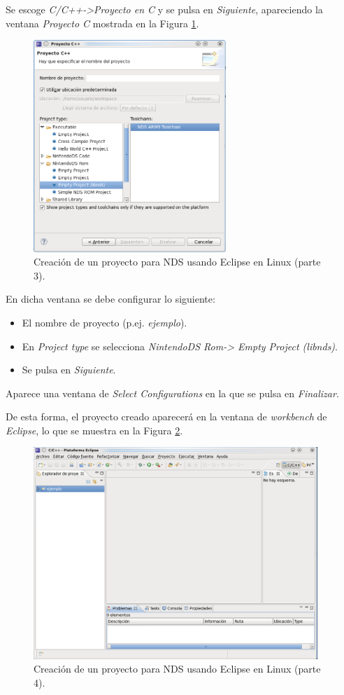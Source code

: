 Se escoge \textit{C/C++->Proyecto en C} y se pulsa en \textit{Siguiente}, apareciendo la ventana \textit{Proyecto C} mostrada en la Figura \ref{fig_pig_p3_c1_eclipel3}.

\begin{figure}[t]
	\centering
	\includegraphics[height=8cm]{./Figuras/C2/c2_instan3.png}
	\caption{Creación de un proyecto para NDS usando Eclipse en Linux (parte 3).}
	\label{fig_pig_p3_c1_eclipel3}
\end{figure}

En dicha ventana se debe configurar lo siguiente:
 \begin{itemize}
 	\item El nombre de proyecto (p.ej. \textit{ejemplo}).
 	\item En \textit{Project type} se selecciona \textit{NintendoDS Rom-> Empty Project (libnds)}.
 	\item Se pulsa en \textit{Siguiente}.
 \end{itemize}

Aparece una ventana de \textit{Select Configurations} en la que se pulsa en \textit{Finalizar}. 

De esta forma, el  proyecto creado aparecerá en la ventana de \textit{workbench} de \textit{Eclipse}, lo que se muestra en la Figura \ref{fig_pig_p3_c1_eclipel4}.

\begin{figure}[t]
	\centering
	\includegraphics[height=8cm]{./Figuras/C2/c2_instan4.png}
	\caption{Creación de un proyecto para NDS usando Eclipse en Linux (parte 4).}
	\label{fig_pig_p3_c1_eclipel4}
\end{figure}

